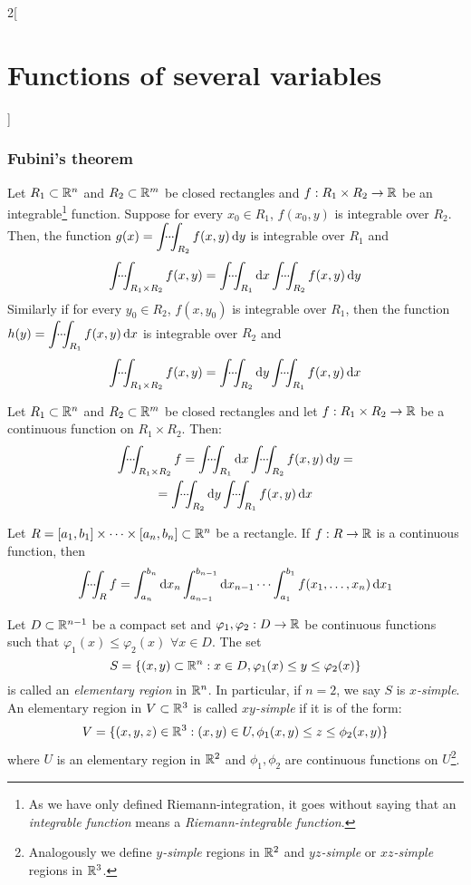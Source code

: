 \documentclass[../../../main.tex]{subfiles}
\begin{document}
\begin{multicols}{2}[\section{Functions of several variables}]
  \subsubsection{Fubini's theorem}
  \begin{theorem}
    Let $R_1\subset\mathbb{R}^n$ and $R_2\subset\mathbb{R}^m$ be closed rectangles and $f:R_1\times R_2\rightarrow\mathbb{R} $ be an integrable\footnote{As we have only defined Riemann-integration, it goes without saying that an \emph{integrable function} means a \emph{Riemann-integrable function}.} function. Suppose for every $x_0\in R_1$, $f(x_0,y)$ is integrable over $R_2$. Then, the function $\displaystyle g(x)=\dotsint_{R_2}f(x,y)\dd{y}$ is integrable over $R_1$ and $$\dotsint_{R_1\times R_2}f(x,y)=\dotsint_{R_1}\dd{x}\dotsint_{R_2}f(x,y)\dd{y}$$ Similarly if for every $y_0\in R_2$, $f(x,y_0)$ is integrable over $R_1$, then the function $\displaystyle h(y)=\dotsint_{R_1}f(x,y)\dd{x}$ is integrable over $R_2$ and $$\dotsint_{R_1\times R_2}f(x,y)=\dotsint_{R_2}\dd{y}\dotsint_{R_1}f(x,y)\dd{x}$$
    \begin{corollary}
      Let $R_1\subset\mathbb{R}^n$ and $R_2\subset\mathbb{R}^m$ be closed rectangles and let $f:R_1\times R_2\rightarrow\mathbb{R} $ be a continuous function on $R_1\times R_2$. Then: \begin{multline*}
        \dotsint_{R_1\times R_2}f=\dotsint_{R_1}\dd{x}\dotsint_{R_2}f(x,y)\dd{y}=\\=\dotsint_{R_2}\dd{y}\dotsint_{R_1}f(x,y)\dd{x}
      \end{multline*}
    \end{corollary}
    \begin{corollary}
      Let $R=[a_1,b_1]\times\cdots\times[a_n,b_n]\subset\mathbb{R}^n$ be a rectangle. If $f:R\rightarrow\mathbb{R} $ is a continuous function, then $$\dotsint_Rf=\int_{a_n}^{b_n}\dd{x_n}\int_{a_{n-1}}^{b_{n-1}}\dd{x_{n-1}}\cdots\int_{a_1}^{b_1}f(x_1,\ldots,x_n)\dd{x_1}$$
    \end{corollary}
    \begin{definition}
      Let $D\subset\mathbb{R}^{n-1}$ be a compact set and $\varphi_1,\varphi_2:D\rightarrow\mathbb{R} $ be continuous functions such that $\varphi_1(x)\leq\varphi_2(x)$ $\forall x\in D$. The set $$S=\{(x,y)\subset\mathbb{R}^n:x\in D, \varphi_1(x)\leq y\leq\varphi_2(x)\}$$ is called an \emph{elementary region} in $\mathbb{R}^n$. In particular, if $n=2$, we say $S$ is \emph{$x$-simple}. An elementary region in $V\subset\mathbb{R}^3$ is called \emph{$xy$-simple} if it is of the form: $$V=\{(x,y,z)\in\mathbb{R}^3:(x,y)\in U, \phi_1(x,y)\leq z\leq\phi_2(x,y)\}$$ where $U$ is an elementary region in $\mathbb{R}^2$ and $\phi_1,\phi_2$ are continuous functions on $U$\footnote{Analogously we define \emph{$y$-simple} regions in $\mathbb{R}^2$ and \emph{$yz$-simple} or \emph{$xz$-simple} regions in $\mathbb{R}^3$.}.

\end{definition}
\end{theorem}
\end{multicols}
\end{document}
